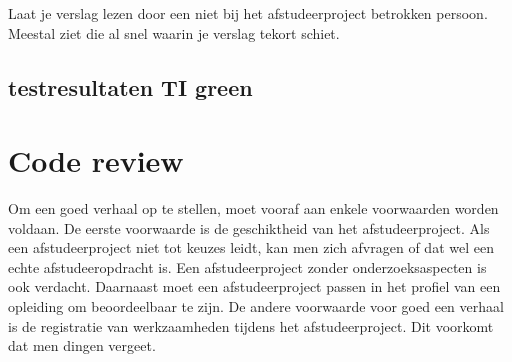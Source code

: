 			Laat je verslag lezen door een niet bij het afstudeerproject betrokken
			persoon. Meestal ziet die al snel waarin je verslag tekort schiet.
			
			
			\begin{center}
			\end{center}
			
			
			
			
			
			
			
			
			\section{testresultaten TI green}
			
%			
%			
%				
			
			
			\chapter{Code review}
			
			Om een goed verhaal op te stellen, moet vooraf aan enkele voorwaarden
			worden voldaan. De eerste voorwaarde is de geschiktheid van het
			afstudeerproject. Als een afstudeerproject niet tot keuzes leidt, kan
			men zich afvragen of dat wel een echte afstudeeropdracht is. Een
			afstudeerproject zonder onderzoeksaspecten is ook verdacht. Daarnaast
			moet een afstudeerproject passen in het profiel van een opleiding om
			beoordeelbaar te zijn. De andere voorwaarde voor goed een verhaal is
			de registratie van werkzaamheden tijdens het afstudeerproject. Dit
			voorkomt dat men dingen vergeet.
